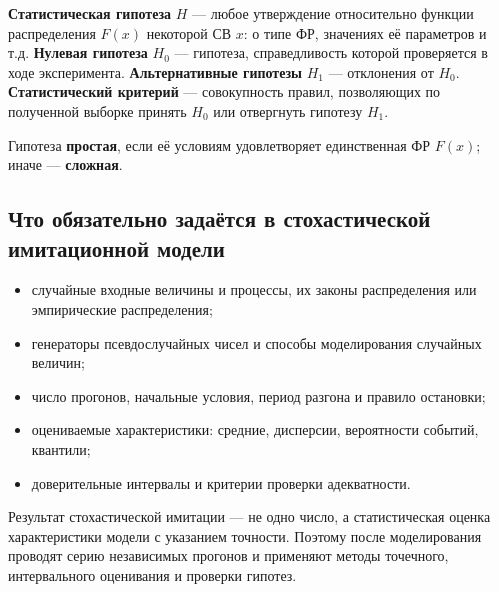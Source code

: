 \textbf{Статистическая гипотеза} $H$ — любое утверждение относительно функции распределения $F(x)$ некоторой СВ $x$: о типе ФР, значениях её параметров и т.д.
\textbf{Нулевая гипотеза} $H_0$ — гипотеза, справедливость которой проверяется в ходе эксперимента.
\textbf{Альтернативные гипотезы} $H_1$ — отклонения от $H_0$.
\textbf{Статистический критерий} — совокупность правил, позволяющих по полученной выборке принять $H_0$ или отвергнуть гипотезу $H_1$.

Гипотеза \textbf{простая}, если её условиям удовлетворяет единственная ФР $F(x)$; иначе — \textbf{сложная}.

\subsection*{Что обязательно задаётся в стохастической имитационной модели}

\begin{itemize}
  \item случайные входные величины и процессы, их законы распределения или эмпирические распределения;
  \item генераторы псевдослучайных чисел и способы моделирования случайных величин;
  \item число прогонов, начальные условия, период разгона и правило остановки;
  \item оцениваемые характеристики: средние, дисперсии, вероятности событий, квантили;
  \item доверительные интервалы и критерии проверки адекватности.
\end{itemize}

Результат стохастической имитации — не одно число, а статистическая оценка характеристики модели с указанием точности. Поэтому после моделирования проводят серию независимых прогонов и применяют методы точечного, интервального оценивания и проверки гипотез.

\clearpage
